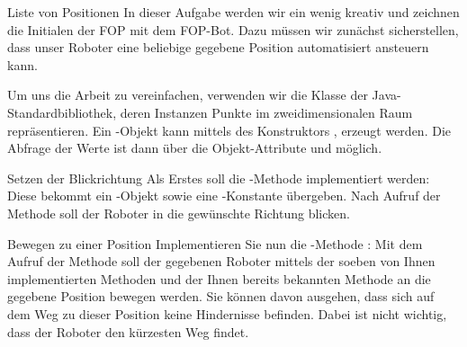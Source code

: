 \documentclass{../tuda-exercise}
\begin{document}
  \begin{task}[credit=\stars{3}{3}]{Liste von Positionen}
    In dieser Aufgabe werden wir ein wenig kreativ und zeichnen die Initialen der FOP mit dem
    FOP-Bot. Dazu müssen wir zunächst sicherstellen, dass unser Roboter eine beliebige gegebene
    Position automatisiert ansteuern kann.

    \br

    Um uns die Arbeit zu vereinfachen, verwenden wir die Klasse  der
    Java-Standardbibliothek, deren Instanzen Punkte im zweidimensionalen Raum repräsentieren. Ein
    -Objekt kann mittels des Konstruktors ,
     erzeugt werden. Die Abfrage der Werte ist dann über die Objekt-Attribute
     und  möglich.

    \begin{subtask*}{Setzen der Blickrichtung}
      Als Erstes soll die -Methode  implementiert werden: Diese bekommt ein -Objekt
      sowie eine -Konstante übergeben. Nach Aufruf der Methode soll der
      Roboter in die gewünschte Richtung blicken.

      \begin{solution}
        
      \end{solution}
    \end{subtask*}

    \clearpagesolution

    \begin{subtask*}{Bewegen zu einer Position}
      Implementieren Sie nun die -Methode : Mit dem Aufruf der Methode soll der gegebenen Roboter mittels der
      soeben von Ihnen implementierten Methoden  und der Ihnen bereits
      bekannten Methode  an die gegebene Position bewegen werden. Sie können
      davon ausgehen, dass sich auf dem Weg zu dieser Position keine Hindernisse befinden.
      Dabei ist nicht wichtig, dass der Roboter den kürzesten Weg findet.

      \begin{solution}
        
      \end{solution}
    \end{subtask*}


\end{task}
\end{document}
